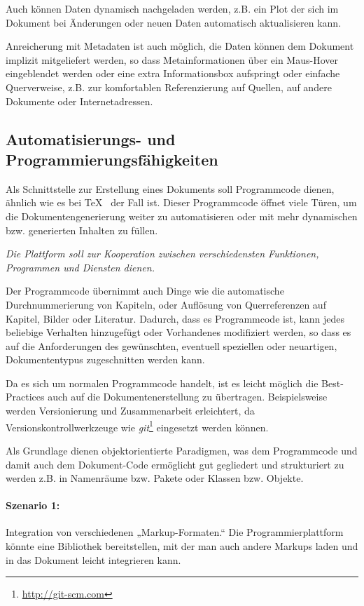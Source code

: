 Auch können Daten dynamisch nachgeladen werden, z.B. ein Plot der sich
im Dokument bei Änderungen oder neuen Daten automatisch aktualisieren kann.

Anreicherung mit Metadaten ist auch möglich, die Daten können dem Dokument
implizit mitgeliefert werden, so dass Metainformationen über ein Maus-Hover
eingeblendet werden oder eine extra Informationsbox aufspringt oder einfache
Querverweise, z.B. zur komfortablen Referenzierung auf Quellen,
auf andere Dokumente oder Internetadressen.

\subsection{Automatisierungs- und Programmierungsfähigkeiten}\label{sec-idee-szenarien}

Als Schnittstelle zur Erstellung eines Dokuments soll Programmcode
dienen, ähnlich wie es bei \TeX~ der Fall ist. Dieser Programmcode
öffnet viele Türen, um die Dokumentengenerierung weiter
zu automatisieren oder mit mehr dynamischen bzw. generierten Inhalten
zu füllen.

\emph{Die Plattform soll zur Kooperation zwischen verschiedensten
Funktionen, Programmen und Diensten dienen.}

Der Programmcode übernimmt auch Dinge wie die automatische Durchnummerierung
von Kapiteln, oder Auflösung von Querreferenzen auf Kapitel, Bilder oder
Literatur. Dadurch, dass es Programmcode ist, kann jedes beliebige Verhalten
hinzugefügt oder Vorhandenes modifiziert werden, so dass es auf die Anforderungen
des gewünschten, eventuell speziellen oder neuartigen, Dokumententypus
zugeschnitten werden kann.

Da es sich um normalen Programmcode handelt, ist es leicht möglich die
Best-Practices auch auf die Dokumentenerstellung zu übertragen.
Beispielsweise werden Versionierung und Zusammenarbeit erleichtert,
da Versionskontrollwerkzeuge wie \emph{git}\footnote{\url{http://git-scm.com}}
eingesetzt werden können.

Als Grundlage dienen objektorientierte Paradigmen, was dem Programmcode
und damit auch dem Dokument-Code ermöglicht gut gegliedert und strukturiert
zu werden z.B. in Namenräume bzw. Pakete oder Klassen bzw. Objekte.

\paragraph{Szenario 1:} Integration von verschiedenen „Markup-Formaten.“
Die Programmierplattform könnte eine Bibliothek bereitstellen, mit der
man auch andere Markups laden und in das Dokument leicht integrieren
kann.

